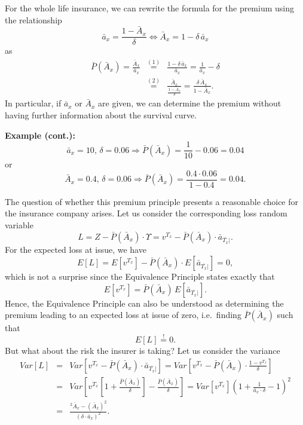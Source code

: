 \documentclass[11pt,fleqn,oneside]{book}
\begin{document}
For the whole life insurance, we can rewrite the formula for the premium using the relationship
$$
\bar{a}_x = \frac{1 - \bar{A}_x}{\delta} \Leftrightarrow \bar{A}_x = 1 - \delta \, \bar{a}_x
$$
as
\begin{eqnarray*}
{\bar{P}\left(\bar{A}_x\right)} = \frac{\bar{A}_x}{\bar{a}_x} &\stackrel{(1)}{=}& \frac{1 - \delta \, \bar{a}_x}{\bar{a}_x}
= \frac{1}{\bar{a}_x} - \delta \\
& \stackrel{(2)}{=}& \frac{\bar{A}_x}{\frac{1 - \bar{A}_x}{\delta}} = \frac{\delta \, \bar{A}_x}{1 - \bar{A}_x}.
\end{eqnarray*}
In particular, if $\bar{a}_x$ or $\bar{A}_x$ are given, we can determine the premium without having further information about the survival curve.

\noindent \textbf{Example (cont.):}
$$
\bar{a}_x = 10,\,\delta = 0.06 \Rightarrow {\bar{P}\left(\bar{A}_x\right)} = \frac{1}{10} - 0.06 = 0.04
$$ 
or
$$
\bar{A}_x = 0.4,\,\delta = 0.06 \Rightarrow {\bar{P}\left(\bar{A}_x\right)} = \frac{0.4 \cdot 0.06}{1 - 0.4} = 0.04.
$$

The question of whether this premium principle presents a reasonable choice for the insurance company arises. Let us consider the corresponding loss random variable
$$
L = Z - {\bar{P}\left(\bar{A}_x\right)} \cdot \Upsilon = v^{T_x} - {\bar{P}\left(\bar{A}_x\right)}\cdot \bar{a}_{\overline{T_x}|}.
$$
For the expected loss at issue, we have
$$
E[L] = E[v^{T_x}] - {\bar{P}\left(\bar{A}_x\right)} \cdot E[\bar{a}_{\overline{T_x}|}] = 0,
$$
which is not a surprise since the Equivalence Principle states exactly that
$$
E[v^{T_x}] = {\bar{P}\left(\bar{A}_x\right)}\,E[\bar{a}_{\overline{T_x}|}].
$$
Hence, the Equivalence Principle can also be understood as determining the premium leading to an expected loss at issue of zero, i.e.\ finding ${\bar{P}\left(\bar{A}_x\right)}$ such that
$$
E[L] \stackrel{!}{=} 0.
$$ 
But what about the risk the insurer is taking? Let us consider the variance
\begin{eqnarray*}
Var[L] &=& Var\left[v^{T_x} - {\bar{P}\left(\bar{A}_x\right)}\cdot \bar{a}_{\overline{T_x}|}\right] = Var\left[v^{T_x} - {\bar{P}\left(\bar{A}_x\right)} \cdot \frac{1 - v^{T_x}}{\delta}\right]\\
&=& Var\left[v^{T_x}\left[1 + \frac{{\bar{P}\left(\bar{A}_x\right)}}{\delta}\right] - \frac{{\bar{P}\left(\bar{A}_x\right)}}{\delta} \right] = Var\left[v^{T_x}\right] \left(1 + \frac{1}{\bar{a}_x\cdot \delta}-1\right)^2\\
&=& \frac{{^2\bar{A}_x} - \left(\bar{A}_x\right)^2}{\left(\delta \cdot \bar{a}_x\right)^2}.
\end{eqnarray*}
\end{document}
